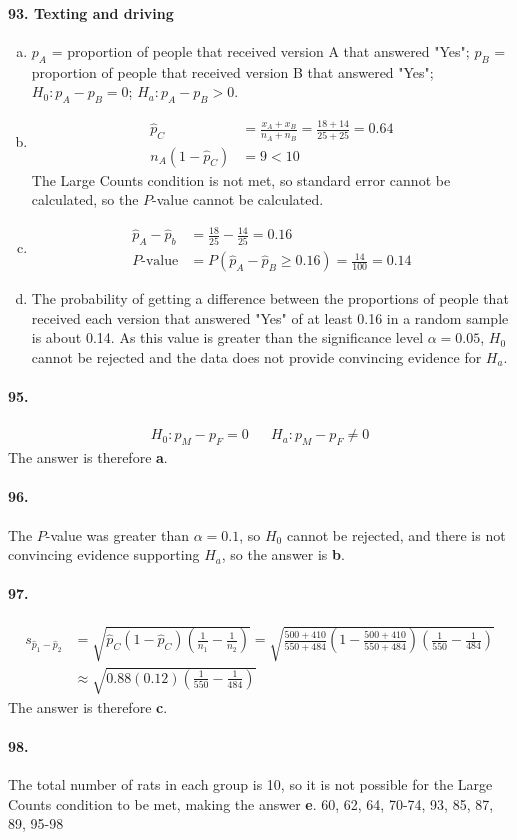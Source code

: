 \documentclass[12pt, A4]{article}
\newcommand{\propsee}[3]{\sqrt{#1\left(1 - #1\right)\left(\frac{1}{#2} - \frac{1}{#3}\right)}}
\newcommand{\propseet}[4]{\sqrt{#1\left(#2\right)\left(\frac{1}{#3} - \frac{1}{#4}\right)}}
\begin{document}
			\paragraph{93. Texting and driving}
				\begin{enumerate}[a.]
					\item
						$p_A$ = proportion of people that received version A that answered "Yes"; $p_B$ = proportion of people that received version B that answered "Yes"; $H_0: p_A - p_B = 0$; $H_a: p_A - p_B > 0$.
					\item
						\begin{align*}
							\hat{p}_C &= \frac{x_A + x_B}{n_A + n_B} = \frac{18 + 14}{25 + 25} = 0.64 \\
							n_A(1 - \hat{p}_C) &= 9 < 10
						\end{align*}
						The Large Counts condition is not met, so standard error cannot be calculated, so the $P$-value cannot be calculated.
					\item
						\begin{align*}
							\hat{p}_A - \hat{p}_b &= \frac{18}{25} - \frac{14}{25} = 0.16 \\
							P\text{-value} &= P(\hat{p}_A - \hat{p}_B \ge 0.16) = \frac{14}{100} = 0.14
						\end{align*}
					\item
						The probability of getting a difference between the proportions of people that received each version that answered "Yes" of at least 0.16 in a random sample is about 0.14. As this value is greater than the significance level $\alpha = 0.05$, $H_0$ cannot be rejected and the data does not provide convincing evidence for $H_a$.
				\end{enumerate}
			\paragraph{95.}
				\begin{align*}
					H_0:p_M - p_F = 0 && H_a: p_M - p_F \ne 0
				\end{align*}
				The answer is therefore \textbf{a}.
			\paragraph{96.}
				The $P$-value was greater than $\alpha = 0.1$, so $H_0$ cannot be rejected, and there is not convincing evidence supporting $H_a$, so the answer is \textbf{b}.
			\paragraph{97.}
				\begin{align*}
					s_{\hat{p}_1 - \hat{p}_2} &= \propsee{\hat{p}_C}{n_1}{n_2} = \propsee{\frac{500 + 410}{550 + 484}}{550}{484} \\
					&\approx \propseet{0.88}{0.12}{550}{484}
				\end{align*}
				The answer is therefore \textbf{c}.
			\paragraph{98.}
				The total number of rats in each group is 10, so it is not possible for the Large Counts condition to be met, making the answer \textbf{e}.
			60, 62, 64, 70-74, 93, 85, 87, 89, 95-98
\end{document}
